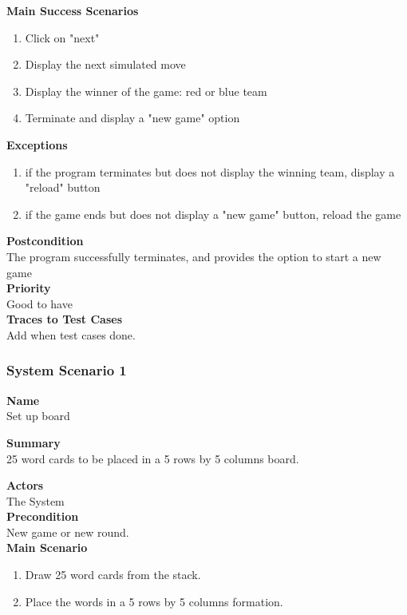 \documentclass[12pt]{article}
\begin{document}
\noindent
{\bf Main Success Scenarios}\\
\vspace*{-0.2in}
\begin{enumerate}
\item Click on "next"
\item Display the next simulated move
\item Display the winner of the game: red or blue team
\item Terminate and display a "new game" option 
\end{enumerate}
\noindent
{\bf Exceptions}
\begin{enumerate}
\item if the program terminates but does not display the winning team, display a "reload" button
\item if the game ends but does not display a "new game" button, reload the game
\end{enumerate}
\noindent
{\bf Postcondition}\\
The program successfully terminates, and provides the option to start a new game\\
\noindent
{\bf Priority}\\
Good to have\\
\noindent
{\bf Traces to Test Cases}\\
Add when test cases done.
\newpage

\subsubsection{System Scenario 1} \label{ss:1}

\noindent
{\bf Name}\\
Set up board

\noindent
{\bf Summary}\\
25 word cards to be placed in a 5 rows by 5 columns board.

\noindent
{\bf Actors}\\
The System\\
\noindent
{\bf Precondition}\\
New game or new round.\\
\noindent
{\bf Main Scenario}\\
\vspace*{-0.2in}
\begin{enumerate}
\item Draw 25 word cards from the stack.
\item Place the words in a 5 rows by 5 columns formation.
\end{enumerate}
\end{document}
